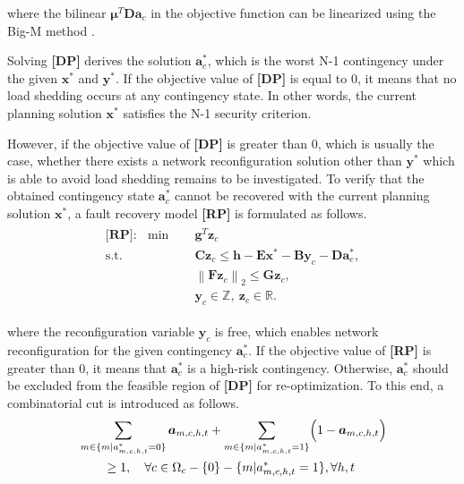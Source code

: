 \documentclass[a4paper,fleqn]{cas-dc}
\begin{document}
\noindent where the bilinear 
$ \boldsymbol{\mu}^{T} \boldsymbol{D} \boldsymbol{a}_{c} $ in the objective 
function can be linearized using the Big-M method \cite{Wu_2018_bi-level}.

Solving \textbf{[DP]} derives the solution $ \boldsymbol{a}_{c}^{*} $, 
which is the worst N-1 contingency under the given $ \boldsymbol{x}^{*} $ 
and $ \boldsymbol{y}^{*} $. If the objective value of \textbf{[DP]} is 
equal to $ 0 $, it means that no load shedding occurs at any contingency
state. In other words, the current planning solution $ \boldsymbol{x}^{*} $ 
satisfies the N-1 security criterion.

However, if the objective value of \textbf{[DP]} is greater than $ 0 $,
which is usually the case, whether there exists a network reconfiguration 
solution other than $ \boldsymbol{y}^{*} $ which is able to avoid load 
shedding remains to be investigated. To verify that the obtained 
contingency state $ \boldsymbol{a}_{c}^{*} $ cannot be recovered with 
the current planning solution $ \boldsymbol{x}^{*} $, a fault recovery 
model \textbf{[RP]} is formulated as follows.
\begin{align}
    \label{RP}
    \begin{aligned}
        \textbf{[RP]}: \ \ \min \quad &
        \boldsymbol{g}^{T} \boldsymbol{z}_{c} \\
        \text{s.t.} \quad
        & \boldsymbol{C} \boldsymbol{z}_{c} \leq 
        \boldsymbol{h} - 
        \boldsymbol{E} \boldsymbol{x}^{*} - 
        \boldsymbol{B} \boldsymbol{y}_{c} - 
        \boldsymbol{D} \boldsymbol{a}_{c}^{*}, \\
        & \left\| \boldsymbol{F} \boldsymbol{z}_{c} \right\|_{2} \leq 
        \boldsymbol{G} \boldsymbol{z}_{c}, \\
        & \boldsymbol{y}_{c} \in \mathbb{Z}, \
        \boldsymbol{z}_{c} \in \mathbb{R}.
    \end{aligned}
\end{align}

\noindent where the reconfiguration variable $ \boldsymbol{y}_{c} $ is free,
which enables network reconfiguration for the given contingency 
$ \boldsymbol{a}_{c}^{*} $. If the objective value of \textbf{[RP]} is greater
than $ 0 $, it means that $ \boldsymbol{a}_{c}^{*} $ is a high-risk 
contingency. Otherwise, $ \boldsymbol{a}_{c}^{*} $ should be excluded from 
the feasible region of \textbf{[DP]} for re-optimization. To this end, a 
combinatorial cut is introduced as follows.
\begin{align}
    \label{cut}
    \begin{aligned}
    &
    \sum_{m \in \{ m | a_{m,c,h,t}^{*} = 0 \}} 
    \boldsymbol{a}_{m,c,h,t} +
    \sum_{m \in \{ m | a_{m,c,h,t}^{*} = 1 \}} 
    \Bigl( 1 - \boldsymbol{a}_{m,c,h,t} \Bigr) \\
    & 
    \quad \quad \geq 1, 
    \quad \forall c \in \Omega_{c} - \{0\} - \{ m | a_{m,c,h,t}^{*} = 1 \}, 
    \forall h,t
    \end{aligned}
\end{align}
\end{document}
